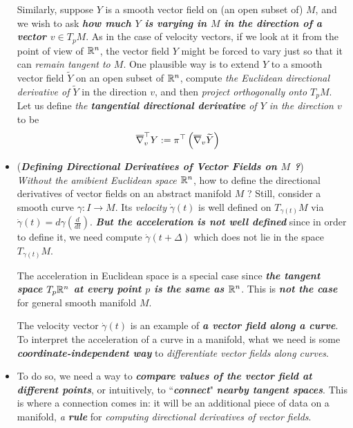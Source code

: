 \documentclass[11pt]{article}
\begin{document}
\begin{itemize}
\begin{remark}
Similarly, suppose $Y$ is a smooth vector field on (an open subset of) $M$, and we wish to ask \emph{\textbf{how much $Y$ is varying in $M$ in the direction of a vector $v \in T_{p}M$}}. As in the case of velocity vectors, if we look at it from the point of view of ${\mathbb R}^n$, the vector field $Y$ might be forced to vary just so that it can \emph{remain tangent to $M$}. One plausible way is to extend $Y$ to a smooth vector field $\widetilde{Y}$ on an open subset of ${\mathbb R}^n$, compute \emph{the Euclidean directional derivative of $\widetilde{Y}$} in the direction $v$, and then \emph{project orthogonally onto $T_{p}M$}. Let us define \emph{the \textbf{tangential directional derivative} of $Y$ in the direction $v$} to be
\begin{align}
\overline{\nabla}_{v}^{\top}Y &:= \pi^{\top}\left(\overline{\nabla}_{v}\widetilde{Y}\right) \label{eqn: tangential_directional_derivative}
\end{align} 
\end{remark}

\item \begin{remark} (\emph{\textbf{Defining Directional Derivatives of Vector Fields on $M$ ?}})\\
\emph{Without the amibient Euclidean space ${\mathbb R}^{n}$}, how to define the directional derivatives of vector fields on an abstract manifold $M$ ? Still, consider a smooth curve $\gamma: I \rightarrow M$. Its \emph{velocity} $\dot{\gamma}(t)$ is well defined on $T_{\gamma(t)}M$ via $\dot{\gamma}(t) = d\gamma(\frac{d}{dt})$. \emph{\textbf{But the acceleration is not well defined}} since in order to define it, we need compute $\dot{\gamma}(t + \Delta)$ which does not lie in the space $T_{\gamma(t)}M$.

The acceleration in Euclidean space is a special case since \emph{\textbf{the tangent space $T_{p}{\mathbb R}^n$ at every point $p$ is the same as ${\mathbb R}^n$}}. This is \emph{\textbf{not the case}} for general smooth manifold $M$.

The velocity vector $\dot{\gamma}(t)$ is an example of \emph{\textbf{a vector field along a curve}}. To interpret the acceleration of a curve in a manifold, what we need is some \emph{\textbf{coordinate-independent way}} to \emph{differentiate vector fields along curves}.
\end{remark}

\item \begin{remark}
To do so, we need a way to \emph{\textbf{compare values of the vector field at different points}}, or intuitively, to ``\emph{\textbf{connect}}" \emph{\textbf{nearby tangent spaces}}. This is where a connection comes in: it will be an additional piece of data on a manifold, \emph{a \textbf{rule}} for \emph{computing directional derivatives of vector fields}.
\end{remark}

\end{itemize}
\end{document}

